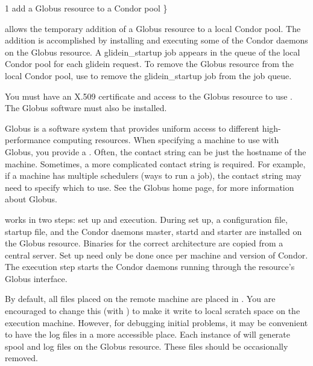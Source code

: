 \begin{ManPage}{\label{man-condor-glidein}}{1}
{add a Globus resource to a Condor pool}
\Synopsis {}
 \} \Bar {}


\Description

 allows the temporary addition of a Globus resource to
a local Condor pool.
The addition is accomplished by installing and executing some of the Condor
daemons on the Globus resource.
A glidein\_startup job appears in the queue of the local
Condor pool for each glidein request.
To remove the Globus resource from the local Condor pool,
use  to remove the glidein\_startup job from
the job queue.

You must have an X.509 certificate and access
to the Globus resource to use .
The Globus software must also be installed.

Globus is a software system that provides uniform access to
different high-performance computing resources.
When specifying a machine to use with Globus,
you provide a .
Often, the contact string can be just the hostname of the machine.
Sometimes, a more complicated contact string is required.
For example, if a machine has multiple schedulers (ways to run a job),
the contact string may need to specify which to use.
See the Globus home page,  for more
information about Globus.

 works in two steps: set up and execution.
During set up, a configuration file, startup file, and the Condor daemons
master, startd and starter are installed on the Globus
resource.
Binaries for the correct architecture are copied from a central server.
Set up need only be done once per machine and version of Condor.
The execution step starts the Condor daemons running through
the resource's Globus interface.

By default, all files placed on the remote machine are placed in
.  You are encouraged
to change this (with ) to make it write to local
scratch space on the execution machine.  However, for debugging
initial problems, it may be convenient to have the log files
in a more accessible place.
Each instance of  will generate spool and log
files on the Globus resource.
These files should be occasionally removed.


\end{ManPage}
